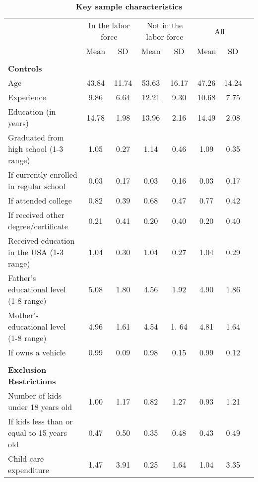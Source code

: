 \begin{center}
{\footnotesize 
\begin{longtable}{lccccccc}
\caption{\textbf{Key sample characteristics}}\label{tb:SumStats}
\vspace{.05in}
\\
\hline \hline
            \multicolumn{1}{c}{} &\multicolumn{2}{c}{In the labor force} &\multicolumn{2}{c}{Not in the labor force} & \multicolumn{2}{c}{All}\\
&        Mean&          SD&        Mean&          SD&        Mean&          SD \\
\hline \hline
\\
\textbf{Controls}\\
\hline
Age         &       43.84&       11.74&       53.63&       16.17&       47.26&       14.24 \\
Experience  &       9.86&       6.64&       12.21&       9.30&       10.68&       7.75\\
Education (in years)&       14.78&       1.98&       13.96&       2.16&       14.49&       2.08\\
Graduated from high school (1-3 range) & 1.05 & 0.27 &  1.14 & 0.46 & 1.09 & 0.35 \\
If currently enrolled in regular school &     0.03  &  0.17  & 0.03   & 0.16 &   0.03  & 0.17 \\
If attended college  &     0.82  &  0.39   & 0.68  & 0.47 & 0.77 & 0.42  \\
If received other degree/certificate  &    0.21  &  0.41  & 0.20 & 0.40 & 0.20 & 0.40 \\
Received  education in the USA  (1-3 range) &     1.04  &   0.30  & 1.04  & 0.27 & 1.04 & 0.29 \\
Father's educational level  (1-8 range) &    5.08   & 1.80  & 4.56 & 1.92 & 4.90 & 1.86 \\
Mother's educational level (1-8 range) &     4.96  &   1.61  & 4.54 & 1. 64 & 4.81 & 1.64 \\
If owns a vehicle &    0.99   & 0.09   & 0.98 & 0.15 & 0.99 & 0.12 \\
\\
\textbf{Exclusion Restrictions}\\
\hline
Number of kids under 18 years old &     1.00  &  1.17  & 0.82 & 1.27 & 0.93 & 1.21 \\
If kids less than or equal to 15 years old  &    0.47  &  0.50  & 0.35 & 0.48 &  0.43 & 0.49  \\
Child care expenditure  &   1.47 &   3.91 & 0.25 & 1.64 & 1.04 & 3.35 \\

\end{longtable}}
\end{center}
